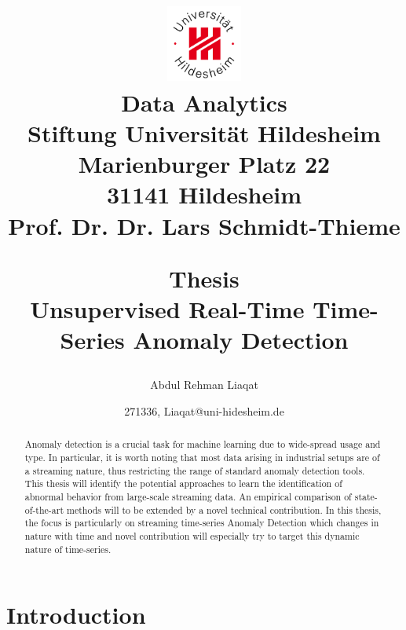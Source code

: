 \documentclass[12pt]{article}
\begin{document}
\title{
\begin{flushright}
\includegraphics[width=2.5cm]{logoUHi.jpg}\\
{\small
Data Analytics\\
Stiftung Universit{\"a}t Hildesheim\\
Marienburger Platz 22\\
31141 Hildesheim\\
Prof. Dr. Dr. Lars Schmidt-Thieme\\
}
\end{flushright}
\bigskip
\begin{center}
Thesis\\
Unsupervised Real-Time Time-Series Anomaly Detection\\
\end{center}
}
\author{Abdul Rehman Liaqat}
\date{271336, Liaqat@uni-hidesheim.de}
\maketitle

\newpage
\tableofcontents
\newpage
\listoffigures
\newpage
\listoftables
\newpage

\begin{abstract}
Anomaly detection is a crucial task for machine learning due to wide-spread usage and type. In particular, it is worth noting that most data arising in industrial setups are of a streaming nature, thus restricting the range of standard anomaly detection tools. This thesis will identify the potential approaches to learn the identification of abnormal behavior from large-scale streaming data. An empirical comparison of state-of-the-art methods will to be extended by a novel technical contribution. In this thesis, the focus is particularly on streaming time-series Anomaly Detection which changes in nature with time and novel contribution will especially try to target this dynamic nature of time-series.
\end{abstract}
\newpage

\section{Introduction}
\end{document}
